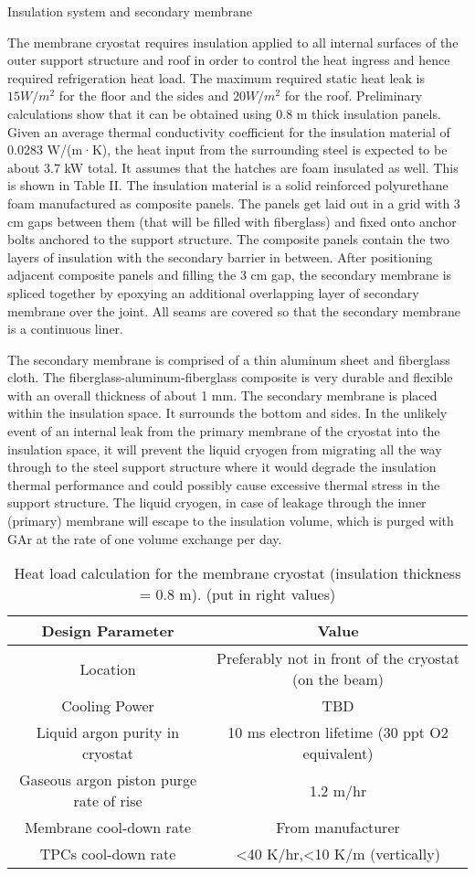 Insulation system and secondary membrane

The membrane cryostat requires insulation applied to all internal surfaces of the outer support structure and roof in order to control the heat ingress and hence required refrigeration heat load. The maximum required static heat leak is $15 W/m^2$ for the floor and the sides and $20 W/m^2$ for the roof. Preliminary calculations show that it can be obtained using 0.8 m thick insulation panels. Given an average thermal conductivity coefficient for the insulation material of 0.0283 W/(m·K), the heat input from the surrounding steel is expected to be about 3.7 kW total. It assumes that the hatches are foam insulated as well. This is shown in Table II.
The insulation material is a solid reinforced polyurethane foam manufactured as composite panels. The panels get laid out in a grid with 3 cm gaps between them (that will be filled with fiberglass) and fixed onto anchor bolts anchored to the support structure. The composite panels contain the two layers of insulation with the secondary barrier in between. After positioning adjacent composite panels and filling the 3 cm gap, the secondary membrane is spliced together by epoxying an additional overlapping layer of secondary membrane over the joint. All seams are covered so that the secondary membrane is a continuous liner.

The secondary membrane is comprised of a thin aluminum sheet and fiberglass cloth. The fiberglass-aluminum-fiberglass composite is very durable and flexible with an overall thickness of about 1 mm. The secondary membrane is placed within the insulation space. It surrounds the bottom and sides. In the unlikely event of an internal leak from the primary membrane of the cryostat into the insulation space, it will prevent the liquid cryogen from migrating all the way through to the steel support structure where it would degrade the insulation thermal performance and could possibly cause excessive thermal stress in the support structure. The liquid cryogen, in case of leakage through the inner (primary) membrane will escape to the insulation volume, which is purged with GAr at the rate of one volume exchange per day.

\begin{table}[htpb]
\caption{Heat load calculation for the membrane cryostat (insulation thickness = 0.8 m). (put in right values)}
\label{tbl:heat-load-calc}
\centering
\begin{tabular}[htbp]{cc}
\hline
 Design Parameter & Value \\ \hline
 Location & Preferably not in front of the cryostat (on the beam) \\ \hline
 Cooling Power & TBD  \\ \hline
 Liquid argon purity in cryostat & 10 ms electron lifetime (30 ppt O2 equivalent) \\ 
 Gaseous argon piston purge rate of rise & 1.2 m/hr \\ \hline
 Membrane cool-down rate & From manufacturer \\  \hline
 TPCs cool-down rate & <40 K/hr,<10 K/m (vertically)
 \\ \hline
\end{tabular}
\end{table}

